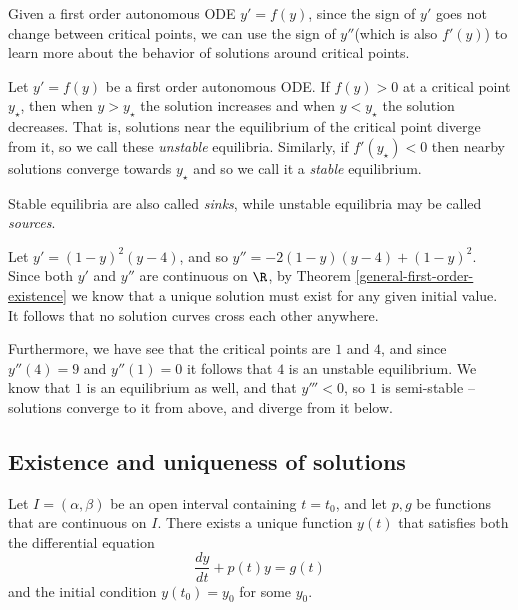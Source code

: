 \documentclass[12pt]{article}
\begin{document}
\begin{rmk}
    Given a first order autonomous ODE $y' = f(y)$, since the sign of $y'$ goes not change between critical points, we can use the sign of $y''$(which is also $f'(y)$) to learn more about the behavior of solutions around critical points.
\end{rmk}

\begin{defn}
    Let $y' = f(y)$ be a first order autonomous ODE. If $f(y) > 0$ at a critical point $y_{\star}$, then when $y > y_{\star}$ the solution increases and when $y < y_{\star}$ the solution decreases. That is, solutions near the equilibrium of the critical point diverge from it, so we call these \emph{unstable} equilibria. Similarly, if $f'(y_{\star}) < 0$ then nearby solutions converge towards $y_{\star}$ and so we call it a \emph{stable} equilibrium.
\end{defn}

\begin{rmk}
    Stable equilibria are also called \emph{sinks}, while unstable equilibria may be called \emph{sources}.
\end{rmk}

\begin{exmp}
    Let $y' = (1-y)^2(y-4)$, and so $y'' = -2(1-y)(y-4) + (1-y)^2$. Since both $y'$ and $y''$ are continuous on $\R$, by Theorem \ref{general-first-order-existence} we know that a unique solution must exist for any given initial value. It follows that no solution curves cross each other anywhere.

    Furthermore, we have see that the critical points are $1$ and $4$, and since $y''(4) = 9$ and $y''(1) = 0$ it follows that $4$ is an unstable equilibrium. We know that $1$ is an equilibrium as well, and that $y''' < 0$, so $1$ is semi-stable -- solutions converge to it from above, and diverge from it below.
\end{exmp}

\subsection{Existence and uniqueness of solutions}

\begin{thm}\label{linear-first-order-existence}
    Let $I = (\alpha, \beta)$ be an open interval containing $t = t_0$, and let $p, g$ be functions that are continuous on $I$. There exists a unique function $y(t)$ that satisfies both the differential equation
    \[\frac{dy}{dt} + p(t)y = g(t)\] and the initial condition $y(t_0) = y_0$ for some $y_0$.
\end{thm}
\end{document}
